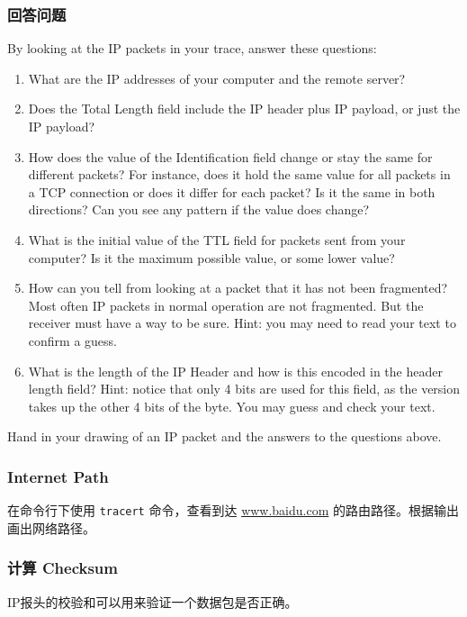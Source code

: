\documentclass{article}
\begin{document}
	\subsubsection{回答问题}
	
	By looking at the IP packets in your trace, answer these questions:
	
	\begin{enumerate}
		\item What are the IP addresses of your computer and the remote server?
		\item Does the Total Length field include the IP header plus IP payload, or just the IP payload?
		\item How does the value of the Identification field change or stay the same for different packets? For instance, does it hold the same value for all packets in a TCP connection or does it differ for each packet? Is it the same in both directions? Can you see any pattern if the value does change?
		\item What is the initial value of the TTL field for packets sent from your computer? Is it the maximum possible value, or some lower value?
		\item How can you tell from looking at a packet that it has not been fragmented? Most often IP packets in normal operation are not fragmented. But the receiver must have a way to be sure. Hint: you may need to read your text to confirm a guess.
		\item What is the length of the IP Header and how is this encoded in the header length field? Hint: notice that only 4 bits are used for this field, as the version takes up the other 4 bits of the byte. You may guess and check your text.
	\end{enumerate}
	
	Hand in your drawing of an IP packet and the answers to the questions above.
	
	\subsubsection{Internet Path}
	
	在命令行下使用 \texttt{tracert} 命令，查看到达 \url{www.baidu.com} 的路由路径。根据输出画出网络路径。
	
	\subsubsection{计算 Checksum}
	
	IP报头的校验和可以用来验证一个数据包是否正确。
	
\end{document}
